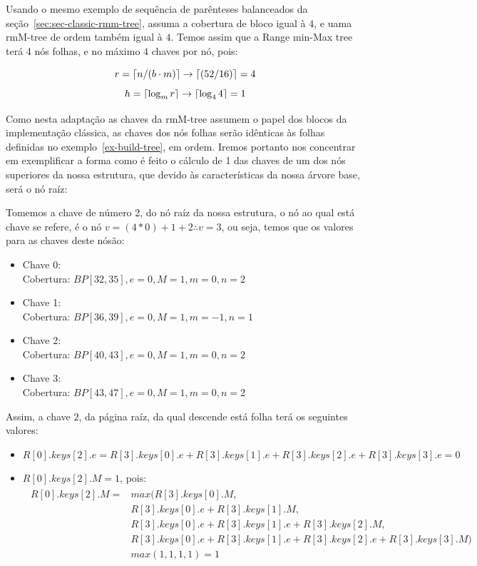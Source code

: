 \begin{example}
Usando o mesmo exemplo de sequência de parênteses balanceados da seção~\ref{sec:sec-classic-rmm-tree},
assuma a cobertura de bloco igual à $4$, e uama rmM-tree de  ordem também igual à $4$. 
Temos assim que a Range min-Max tree terá 4 nós folhas, e no máximo $4$ chaves por nó, pois:

$$r = \lceil n/(b \cdot m)\rceil \to \lceil(52/16)\rceil = 4$$
$$h = \lceil\log_m r\rceil \to \lceil\log_4 4\rceil = 1 $$

Como nesta adaptação as chaves da rmM-tree assumem o papel dos blocos da implementação clássica, as chaves dos nós folhas serão idênticas às folhas
definidas no exemplo~\ref{ex-build-tree}, em ordem. 
Iremos portanto nos concentrar em exemplificar a forma como é feito o cálculo de 1 das chaves
de um dos nós superiores da nossa estrutura, que devido às características da nossa árvore base, será o nó raíz:


Tomemos a chave de número 2, do nó raíz da nossa estrutura, o nó ao qual está chave se refere, é o nó $v = (4*0)+1+2 \therefore v =3$, ou seja, 
temos que os valores para as chaves deste nósão:

\begin{itemize}
    \item Chave 0:\\
    Cobertura: $BP[32,35], e=0, M=1, m=0,n=2$
    \item Chave 1:\\
    Cobertura: $BP[36,39], e=0, M=1, m=-1,n=1$
    \item Chave 2:\\
    Cobertura: $BP[40,43], e=0, M=1, m=0,n=2$
    \item Chave 3:\\
    Cobertura: $BP[43,47], e=0, M=1, m=0,n=2$
\end{itemize}

Assim, a chave $2$, da página raíz, da qual descende está folha terá os seguintes valores:
\begin{itemize}
    \item $R[0].keys[2].e = R[3].keys[0].e + R[3].keys[1].e + R[3].keys[2].e + R[3].keys[3].e=0$
    \item $R[0].keys[2].M = 1$, pois:
    \begin{eqnarray*}
        \begin{split}
            R[0].keys[2].M =& max(R[3].keys[0].M, \\
            &   R[3].keys[0].e + R[3].keys[1].M, \\
            &  R[3].keys[0].e + R[3].keys[1]. e + R[3].keys[2].M,  \\
            &   R[3].keys[0].e + R[3].keys[1]. e + R[3].keys[2].e +  R[3].keys[3].M)\\
            &  max(1, 1, 1,1) = 1
        \end{split}
    \end{eqnarray*}
        

\end{itemize}
\end{example}
